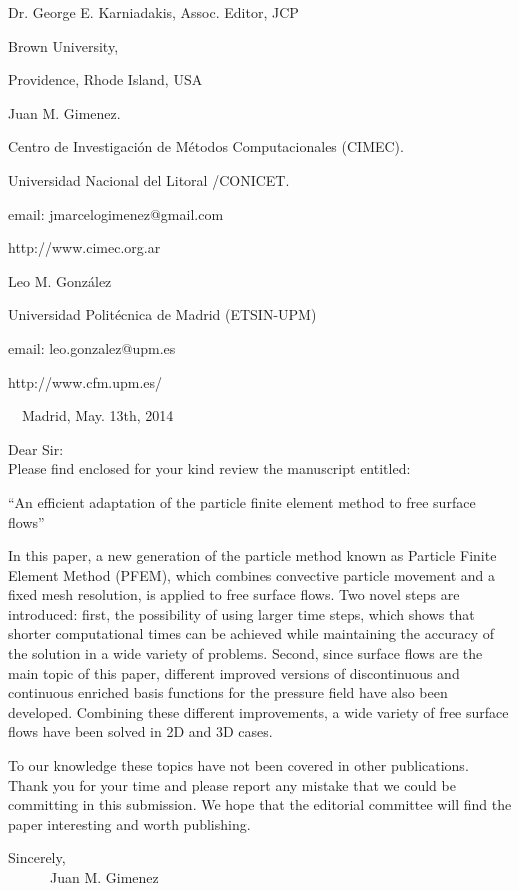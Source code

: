 \documentclass[a4paper,12pt]{article}
\newcommand{\rc}{\\[0.1 in]}
\begin{document}
\thispagestyle{empty}
%
\noindent Dr. George E. Karniadakis, Assoc. Editor, JCP  

Brown University, 

Providence, Rhode Island, USA$$$$


\hspace{6cm}Juan M. Gimenez.

\hspace{6cm}Centro de Investigaci\'on de M\'etodos Computacionales (CIMEC).

\hspace{6cm}Universidad Nacional del Litoral /CONICET.

\hspace{6cm}email: jmarcelogimenez@gmail.com

\hspace{6cm}http://www.cimec.org.ar

\hspace{6cm}

\hspace{6cm}Leo M. Gonz\'{a}lez

\hspace{6cm}Universidad Polit\'{e}cnica de Madrid (ETSIN-UPM)

\hspace{6cm}email: leo.gonzalez@upm.es

\hspace{6cm}http://www.cfm.upm.es/

\vspace{2cm}

$\quad$\hspace{10cm}Madrid, May. 13th, 2014
$$$$

\noindent Dear Sir:\rc
%
Please find enclosed for your kind review the manuscript entitled:
%
\begin{center}
``An efficient adaptation of the particle finite element method to free surface flows''
\end{center}
%
In this paper, a new generation of the particle method known as Particle Finite
 Element Method (PFEM), which combines convective particle movement and a fixed 
 mesh resolution, is applied to free surface flows. Two novel steps are introduced: first, 
 the possibility of using larger time steps, which shows that shorter computational times 
 can be achieved while maintaining the accuracy of the solution in a wide variety of problems. 
 Second, since surface flows are the main topic of this paper, different improved versions of 
 discontinuous and continuous enriched basis functions for the pressure field have also been developed. 
 Combining these different improvements, a wide variety of free surface flows have been solved in 2D and 3D cases.

%
To our knowledge these topics have not been covered in other publications.
%
%
Thank you for your time and please report any mistake that we could be
committing in this submission.
%
We hope that the editorial committee will find the paper interesting and worth
publishing.

%
$$$$
Sincerely,
$$$$
$\quad$$\quad$$\quad$Juan M. Gimenez
$$\quad$$
%
% 
\end{document}
